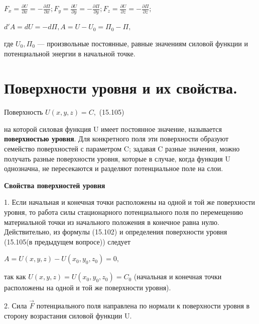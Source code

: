 {\begin{center}
    \par $  F_{x} = \frac{\partial{U}}{\partial{x}} = -\frac{\partial{\Pi}}{\partial{x}}; F_{y} = \frac{\partial{U}}{\partial{y}} = -\frac{\partial{\Pi}}{\partial{y}}; F_{z} = \frac{\partial{U}}{\partial{z}} = -\frac{\partial{\Pi}}{\partial{z}}; $

    \par $d'A = dU = -d\Pi, A=U-U_{0}=\Pi_{0} - \Pi, $

    \par где $U_{0}, \Pi_{0}$ — произвольные постоянные, равные значениям силовой функции и потенциальной энергии в начальной точке.
    
\end{center}
\section{Поверхности уровня и их свойства.}
\begin{center}
    \par Поверхность $U(x,y,z) = C, $ \qquad (15.105)

    \par на которой силовая функция U имеет постоянное значение, называется \textbf{ поверхностью уровня}. Для конкретного поля эти поверхности образуют семейство поверхностей с параметром C; задавая C разные значения, можно получать разные поверхности уровня, которые в случае, когда функция U однозначна, не пересекаются и разделяют потенциальное поле на слои.
    
    \par \textbf{Свойства поверхностей уровня}

    \par 1. Если начальная и конечная точки расположены на одной и той же поверхности уровня, то работа силы стационарного потенциального поля по перемещению материальной точки из начального положения в конечное равна нулю. Действительно, из формулы (15.102) и определения поверхности уровня (15.105(в предыдущем вопросе)) следует

    \par $A=U(x,y,z) - U(x_{0},y_{0},z_{0}) = 0,$
    \par так как $U(x,y,z) = U(x_{0},y_{0},z_{0}) = C_{0}$ (начальная и конечная точки расположены на одной и той же поверхности уровня).

    \par 2. Сила $\vec{F}$ потенциального поля направлена по нормали к поверхности уровня в сторону возрастания силовой функции U.
\end{center}
}
